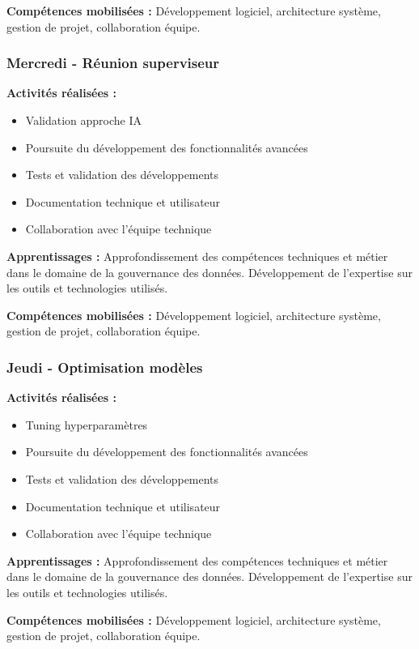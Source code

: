\textbf{Compétences mobilisées :}
Développement logiciel, architecture système, gestion de projet, collaboration équipe.

\subsubsection{Mercredi - Réunion superviseur}

\textbf{Activités réalisées :}
\begin{itemize}
    \item Validation approche IA
    \item Poursuite du développement des fonctionnalités avancées
    \item Tests et validation des développements
    \item Documentation technique et utilisateur
    \item Collaboration avec l'équipe technique
\end{itemize}

\textbf{Apprentissages :}
Approfondissement des compétences techniques et métier dans le domaine de la gouvernance des données. Développement de l'expertise sur les outils et technologies utilisés.

\textbf{Compétences mobilisées :}
Développement logiciel, architecture système, gestion de projet, collaboration équipe.

\subsubsection{Jeudi - Optimisation modèles}

\textbf{Activités réalisées :}
\begin{itemize}
    \item Tuning hyperparamètres
    \item Poursuite du développement des fonctionnalités avancées
    \item Tests et validation des développements
    \item Documentation technique et utilisateur
    \item Collaboration avec l'équipe technique
\end{itemize}

\textbf{Apprentissages :}
Approfondissement des compétences techniques et métier dans le domaine de la gouvernance des données. Développement de l'expertise sur les outils et technologies utilisés.

\textbf{Compétences mobilisées :}
Développement logiciel, architecture système, gestion de projet, collaboration équipe.

